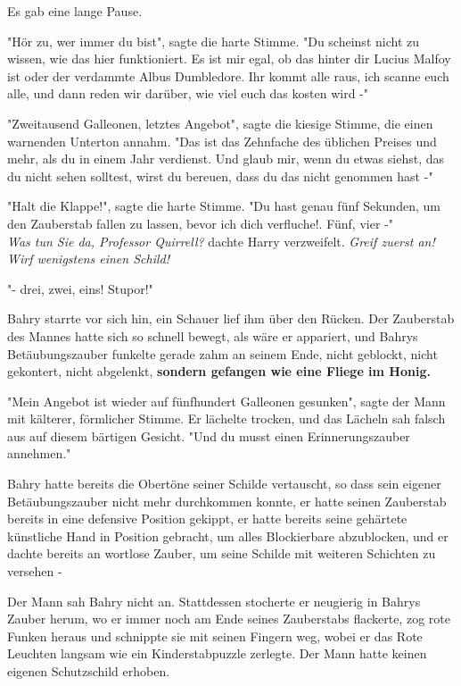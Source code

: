 {Es gab eine lange Pause.

"Hör zu, wer immer du bist", sagte die harte Stimme. "Du scheinst nicht zu wissen, wie das hier funktioniert. Es ist mir egal, ob das hinter dir Lucius Malfoy ist oder der verdammte Albus Dumbledore. Ihr kommt alle raus, ich scanne euch alle, und dann reden wir darüber, wie viel euch das kosten wird -"

"Zweitausend Galleonen, letztes Angebot", sagte die kiesige Stimme, die einen warnenden Unterton annahm. "Das ist das Zehnfache des üblichen Preises und mehr, als du in einem Jahr verdienst. Und glaub mir, wenn du etwas siehst, das du nicht sehen solltest, wirst du bereuen, dass du das nicht genommen hast -"

"Halt die Klappe!", sagte die harte Stimme. "Du hast genau fünf Sekunden, um den Zauberstab fallen zu lassen, bevor ich dich verfluche!. Fünf, vier -"\\ \emph{\hfill\break Was tun Sie da, Professor Quirrell?} dachte Harry verzweifelt. \emph{Greif zuerst an! Wirf wenigstens einen Schild!}

"- drei, zwei, eins! Stupor!"

Bahry starrte vor sich hin, ein Schauer lief ihm über den Rücken. Der Zauberstab des Mannes hatte sich so schnell bewegt, als wäre er appariert, und Bahrys Betäubungszauber funkelte gerade zahm an seinem Ende, nicht geblockt, nicht gekontert, nicht abgelenkt, \textbf{sondern gefangen wie eine Fliege im Honig.}

"Mein Angebot ist wieder auf fünfhundert Galleonen gesunken", sagte der Mann mit kälterer, förmlicher Stimme. Er lächelte trocken, und das Lächeln sah falsch aus auf diesem bärtigen Gesicht. "Und du musst einen Erinnerungszauber annehmen."

Bahry hatte bereits die Obertöne seiner Schilde vertauscht, so dass sein eigener Betäubungszauber nicht mehr durchkommen konnte, er hatte seinen Zauberstab bereits in eine defensive Position gekippt, er hatte bereits seine gehärtete künstliche Hand in Position gebracht, um alles Blockierbare abzublocken, und er dachte bereits an wortlose Zauber, um seine Schilde mit weiteren Schichten zu versehen -

Der Mann sah Bahry nicht an. Stattdessen stocherte er neugierig in Bahrys Zauber herum, wo er immer noch am Ende seines Zauberstabs flackerte, zog rote Funken heraus und schnippte sie mit seinen Fingern weg, wobei er das Rote Leuchten langsam wie ein Kinderstabpuzzle zerlegte. Der Mann hatte keinen eigenen Schutzschild erhoben.

}
